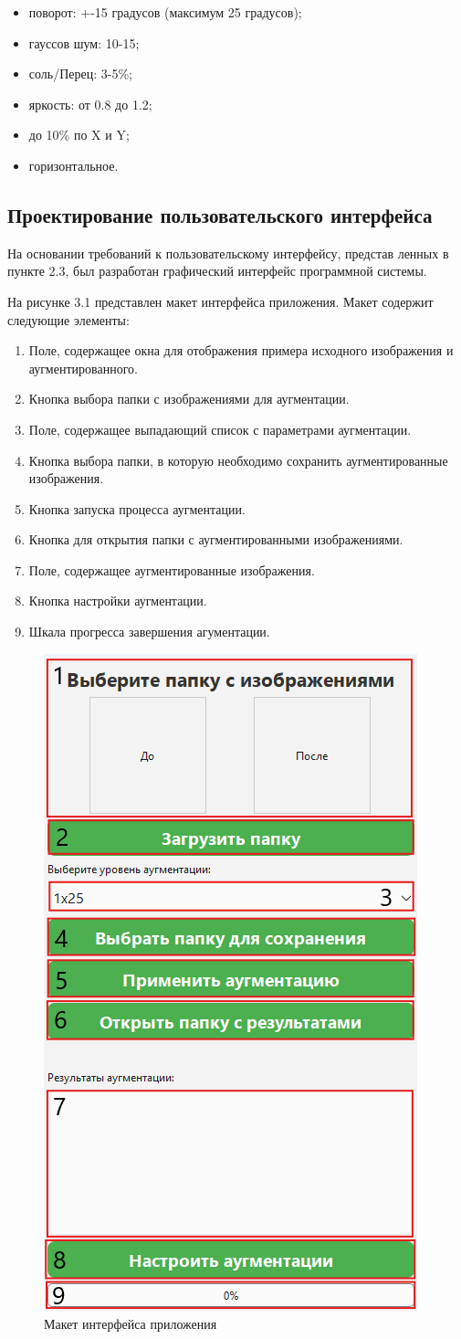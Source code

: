 \begin{itemize}
	\item поворот: +-15 градусов (максимум 25 градусов);
	\item гауссов шум: 10-15;
	\item соль/Перец: 3-5\%;
	\item яркость: от 0.8 до 1.2;
	\item до 10\% по X и Y;
	\item горизонтальное.
\end{itemize}

\subsection{Проектирование пользовательского интерфейса}

На основании требований к пользовательскому интерфейсу, представ
ленных в пункте 2.3, был разработан графический интерфейс программной
системы.

На рисунке 3.1 представлен макет интерфейса приложения. Макет содержит следующие элементы:

\begin{enumerate}
	\item Поле, содержащее окна для отображения примера исходного изображения и аугментированного.
	\item Кнопка выбора папки с изображениями для аугментации.
	\item Поле, содержащее выпадающий список с параметрами аугментации.
	\item Кнопка выбора папки, в которую необходимо сохранить аугментированные изображения.
	\item Кнопка запуска процесса аугментации.
	\item Кнопка для открытия папки с аугментированными изображениями.
	\item Поле, содержащее аугментированные изображения.
	\item Кнопка настройки аугментации.
	\item Шкала прогресса завершения агументации.
\end{enumerate}


\begin{figure}[H]
	\centering
	\includegraphics[width=0.4\linewidth]{images/interfacenum}
	\caption{Макет интерфейса приложения}
	\label{fig:interfacenum}
\end{figure}
